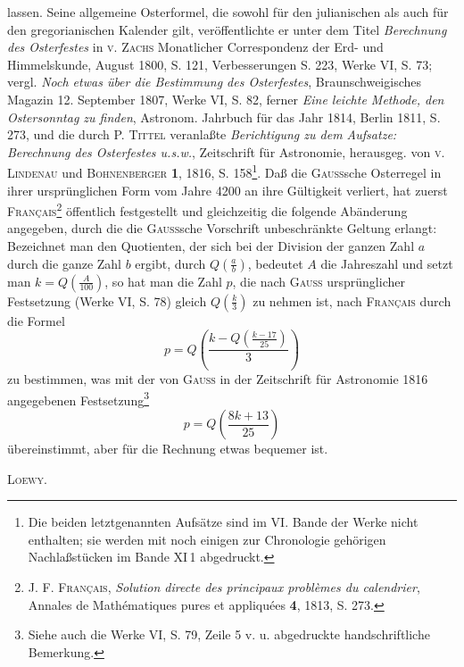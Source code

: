 \clearpage{}
\begingroup\small
\renewcommand{\thefootnote}{*)}
\noindent lassen. Seine allgemeine Osterformel, die sowohl für den julianischen als auch für den gregorianischen Kalender gilt, veröffentlichte er unter dem Titel \textit{Berechnung des Osterfestes} in \textsc{v. Zachs} Monatlicher Correspondenz der Erd- und Himmelskunde, August 1800, S. 121, Verbesserungen S. 223, Werke VI, S. 73; vergl. \textit{Noch etwas über die Bestimmung des Osterfestes}, Braunschweigisches Magazin 12. September 1807, Werke VI, S. 82, ferner \textit{Eine leichte Methode, den Ostersonntag zu finden}, Astronom. Jahrbuch für das Jahr 1814, Berlin 1811, S. 273, und die durch \textsc{P. Tittel} veranlaßte \textit{Berichtigung zu dem Aufsatze: Berechnung des Osterfestes u.s.w.}, Zeitschrift für Astronomie, herausgeg. von \textsc{v. Lindenau} und \textsc{Bohnenberger} \textbf{1}, 1816, S. 158\footnote{Die beiden letztgenannten Aufsätze sind im VI. Bande der Werke nicht enthalten; sie werden mit noch einigen zur Chronologie gehörigen Nachlaßstücken im Bande XI\,1 abgedruckt.}. Daß die \textsc{Gauss}sche Osterregel in ihrer ursprünglichen Form vom Jahre 4200 an ihre Gültigkeit verliert, hat zuerst \textsc{Français}\renewcommand{\thefootnote}{**)}\footnote{\textsc{J. F. Français}, \textit{Solution directe des principaux problèmes du calendrier}, Annales de Mathématiques pures et appliquées \textbf{4}, 1813, S. 273.} öffentlich festgestellt und gleichzeitig die folgende Abänderung angegeben, durch die die \textsc{Gauss}sche Vorschrift unbeschränkte Geltung erlangt: Bezeichnet man den Quotienten, der sich bei der Division der ganzen Zahl \(a\) durch die ganze Zahl \(b\) ergibt, durch \(Q\left(\frac ab\right)\), bedeutet \(A\) die Jahreszahl und setzt man \(k=Q\left(\frac A{100}\right)\), so hat man die Zahl \(p\), die nach \textsc{Gauss} ursprünglicher Festsetzung (Werke VI, S. 78) gleich \(Q\left(\frac k3\right)\) zu nehmen ist, nach \textsc{Français} durch die Formel
\[
p=Q\left(\frac{k-Q\left(\frac{k-17}{25}\right)}3\right)
\]
\noindent zu bestimmen, was mit der von \textsc{Gauss} in der Zeitschrift für Astronomie 1816 angegebenen Festsetzung\renewcommand{\thefootnote}{***)}\footnote{Siehe auch die Werke VI, S. 79, Zeile 5 v. u. abgedruckte handschriftliche Bemerkung.}
\[
p=Q\left(\frac{8k+13}{25}\right)
\]
\noindent übereinstimmt, aber für die Rechnung etwas bequemer ist.
\par\noindent\hfill\textsc{Loewy.}
\par\endgroup

